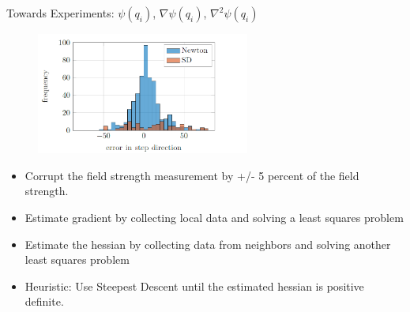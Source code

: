 \begin{frame}{Towards Experiments: $\psi(q_i)$, $\nabla \psi(q_i)$, $\nabla^2\psi(q_i)$}
\begin{figure}[h!]	
		\includegraphics[width=7cm]{figures/newton_SD_direction.png}
		\label{fig:direction_errors_noise}
	\end{figure}
\begin{itemize}
	\item Corrupt the field strength measurement by +/- 5 percent of the field strength. 
	\item Estimate gradient by collecting local data and solving a least squares problem
	\item Estimate the hessian by collecting data from neighbors and solving another least squares problem
	\item Heuristic: Use Steepest Descent until the estimated hessian is positive definite.
\end{itemize}
\end{frame}